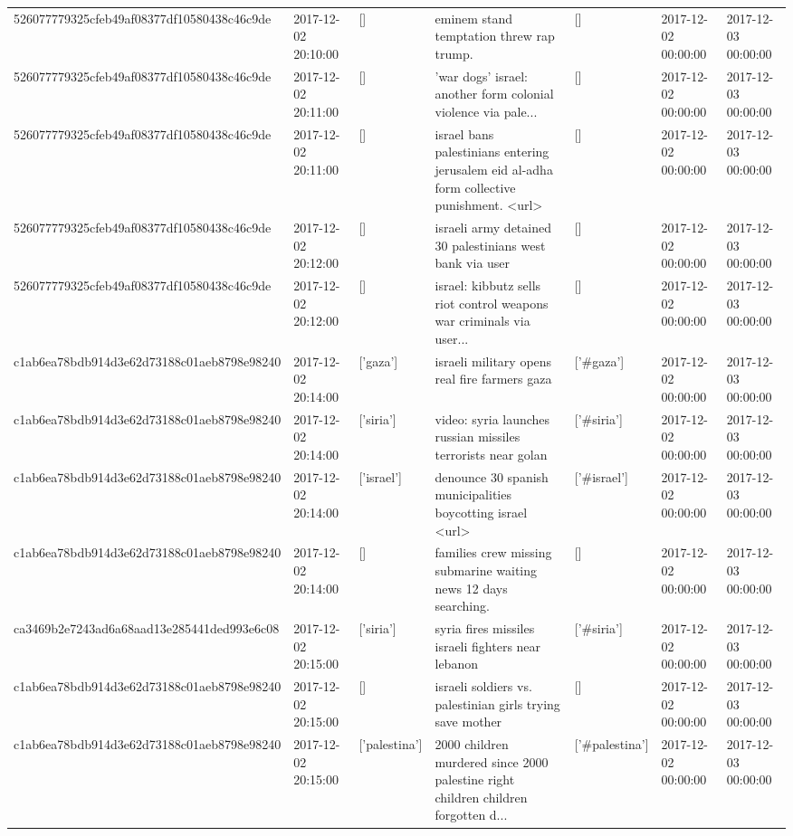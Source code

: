 \begin{tabular}{lllllll}
526077779325cfeb49af08377df10580438c46c9de & 2017-12-02 20:10:00 & [] & eminem stand temptation threw rap trump. & [] & 2017-12-02 00:00:00 & 2017-12-03 00:00:00 \\
526077779325cfeb49af08377df10580438c46c9de & 2017-12-02 20:11:00 & [] & 'war dogs' israel: another form colonial violence via pale... & [] & 2017-12-02 00:00:00 & 2017-12-03 00:00:00 \\
526077779325cfeb49af08377df10580438c46c9de & 2017-12-02 20:11:00 & [] & israel bans palestinians entering jerusalem eid al-adha form collective punishment. <url> & [] & 2017-12-02 00:00:00 & 2017-12-03 00:00:00 \\
526077779325cfeb49af08377df10580438c46c9de & 2017-12-02 20:12:00 & [] & israeli army detained 30 palestinians west bank via user & [] & 2017-12-02 00:00:00 & 2017-12-03 00:00:00 \\
526077779325cfeb49af08377df10580438c46c9de & 2017-12-02 20:12:00 & [] & israel: kibbutz sells riot control weapons war criminals via user... & [] & 2017-12-02 00:00:00 & 2017-12-03 00:00:00 \\
c1ab6ea78bdb914d3e62d73188c01aeb8798e98240 & 2017-12-02 20:14:00 & ['gaza'] & israeli military opens real fire farmers gaza & ['#gaza'] & 2017-12-02 00:00:00 & 2017-12-03 00:00:00 \\
c1ab6ea78bdb914d3e62d73188c01aeb8798e98240 & 2017-12-02 20:14:00 & ['siria'] & video: syria launches russian missiles terrorists near golan & ['#siria'] & 2017-12-02 00:00:00 & 2017-12-03 00:00:00 \\
c1ab6ea78bdb914d3e62d73188c01aeb8798e98240 & 2017-12-02 20:14:00 & ['israel'] & denounce 30 spanish municipalities boycotting israel <url> & ['#israel'] & 2017-12-02 00:00:00 & 2017-12-03 00:00:00 \\
c1ab6ea78bdb914d3e62d73188c01aeb8798e98240 & 2017-12-02 20:14:00 & [] & families crew missing submarine waiting news 12 days searching. & [] & 2017-12-02 00:00:00 & 2017-12-03 00:00:00 \\
ca3469b2e7243ad6a68aad13e285441ded993e6c08 & 2017-12-02 20:15:00 & ['siria'] & syria fires missiles israeli fighters near lebanon & ['#siria'] & 2017-12-02 00:00:00 & 2017-12-03 00:00:00 \\
c1ab6ea78bdb914d3e62d73188c01aeb8798e98240 & 2017-12-02 20:15:00 & [] & israeli soldiers vs. palestinian girls trying save mother & [] & 2017-12-02 00:00:00 & 2017-12-03 00:00:00 \\
c1ab6ea78bdb914d3e62d73188c01aeb8798e98240 & 2017-12-02 20:15:00 & ['palestina'] & 2000 children murdered since 2000 palestine right children children forgotten d... & ['#palestina'] & 2017-12-02 00:00:00 & 2017-12-03 00:00:00 \\

\end{tabular}
